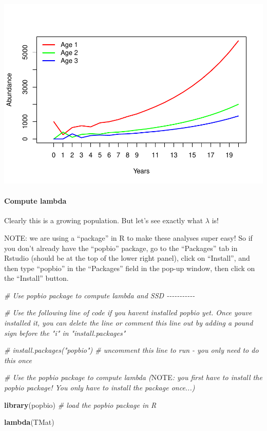 \documentclass[
]{article}
\newenvironment{Shaded}{\begin{snugshade}}{\end{snugshade}}
\newcommand{\AlertTok}[1]{\textcolor[rgb]{0.94,0.16,0.16}{#1}}
\newcommand{\CommentTok}[1]{\textcolor[rgb]{0.56,0.35,0.01}{\textit{#1}}}
\newcommand{\FunctionTok}[1]{\textcolor[rgb]{0.13,0.29,0.53}{\textbf{#1}}}
\newcommand{\NormalTok}[1]{#1}
\begin{document}
\includegraphics{LAB4_files/figure-latex/unnamed-chunk-10-1.pdf}

\hypertarget{compute-lambda}{%
\paragraph{Compute lambda}\label{compute-lambda}}

Clearly this is a growing population. But let's see exactly what
\(\lambda\) is!

NOTE: we are using a ``package'' in R to make these analyses super easy!
So if you don't already have the ``popbio'' package, go to the
``Packages'' tab in Rstudio (should be at the top of the lower right
panel), click on ``Install'', and then type ``popbio'' in the
``Packages'' field in the pop-up window, then click on the ``Install''
button.

\begin{Shaded}
\begin{Highlighting}[]
\CommentTok{\# Use \textquotesingle{}popbio\textquotesingle{} package to compute lambda and SSD {-}{-}{-}{-}{-}{-}{-}{-}{-}{-}{-}}

\CommentTok{\# Use the following line of code if you haven\textquotesingle{}t installed \textquotesingle{}popbio\textquotesingle{} yet. Once you\textquotesingle{}ve installed it, you can delete the line or comment this line out by adding a pound sign before the "i" in "install.packages"}

\CommentTok{\# install.packages("popbio")   \# uncomment this line to run {-} you only need to do this once}

\CommentTok{\# Use the \textquotesingle{}popbio\textquotesingle{} package to compute lambda (}\AlertTok{NOTE}\CommentTok{: you first have to install the popbio package! You only have to install the package once...)}

\FunctionTok{library}\NormalTok{(popbio)   }\CommentTok{\# load the \textquotesingle{}popbio\textquotesingle{} package in R}

\FunctionTok{lambda}\NormalTok{(TMat)}
\end{Highlighting}
\end{Shaded}
\end{document}
